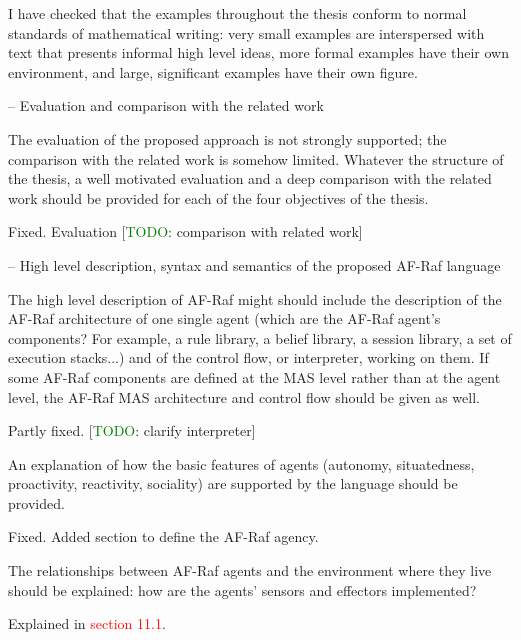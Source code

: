 \documentclass{article}
\newcommand*\R[1]{\textcolor{red}{#1}} %
\newcommand{\todo}[1]{[\textcolor{green}{TODO}: #1]}
\newenvironment{them}{\noindent\begingroup\color{blue}}{\endgroup\par}
\begin{document}
I have checked that the examples throughout the thesis conform to  normal
standards of mathematical writing: very small examples are interspersed with
text that presents informal high level ideas, more formal examples have their
own environment, and large, significant examples have their own figure.

\begin{them}

-- Evaluation and comparison with the related work

The evaluation of the proposed approach is not strongly supported; the
comparison with the related work is somehow limited. Whatever the structure of
the thesis, a well motivated evaluation and a deep comparison with the related
work should be provided for each of the four objectives of the thesis.

\end{them}
Fixed. Evaluation
\todo{comparison with related work}

\begin{them}

-- High level description, syntax and semantics of the proposed AF-Raf language

The high level description of AF-Raf might should include the description of
the AF-Raf architecture of one single agent (which are the AF-Raf agent's
components? For example, a rule library, a belief library, a session library, a
set of execution stacks...) and of the control flow, or interpreter, working on
them. If some AF-Raf components are defined at the MAS level rather than at the
agent level, the AF-Raf MAS architecture and control flow should be given as
well.

\end{them}
Partly fixed.
\todo{clarify interpreter}

\begin{them}

An explanation of how the basic features of agents (autonomy, situatedness,
proactivity, reactivity, sociality) are supported by the language should be
provided. 

\end{them}
Fixed. Added section to define the AF-Raf agency.

\begin{them}

The relationships between AF-Raf agents and the environment where
they live should be explained: how are the agents' sensors and effectors
implemented? 

\end{them}
Explained in \R{section 11.1}.
\end{document}
